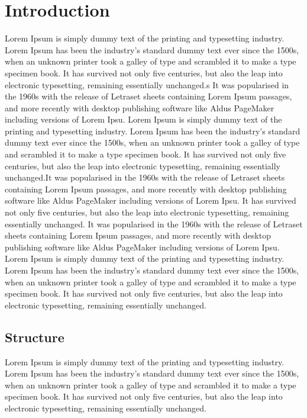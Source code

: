 \chapter{Introduction}
Lorem Ipsum is simply dummy text of the printing and typesetting industry. Lorem Ipsum has been the industry's standard dummy text ever since the 1500s, when an unknown printer took a galley of type and scrambled it to make a type specimen book. It has survived not only five centuries, but also the leap into electronic typesetting, remaining essentially unchanged.s
It was popularised in the 1960s with the release of Letraset sheets containing Lorem Ipsum passages, and more recently with desktop publishing software like Aldus PageMaker including versions of Lorem Ipsu. Lorem Ipsum is simply dummy text of the printing and typesetting industry. Lorem Ipsum has been the industry's standard dummy text ever since the 1500s, when an unknown printer took a galley of type and scrambled it to make a type specimen book.
It has survived not only five centuries, but also the leap into electronic typesetting, remaining essentially unchanged.It was popularised in the 1960s with the release of Letraset sheets containing Lorem Ipsum passages, and more recently with desktop publishing software like Aldus PageMaker including versions of Lorem Ipsu. It has survived not only five centuries, but also the leap into electronic typesetting, remaining essentially unchanged. It was popularised in the 1960s with the release of Letraset sheets containing Lorem Ipsum passages, and more recently with desktop publishing software like Aldus PageMaker including versions of Lorem Ipsu.
Lorem Ipsum is simply dummy text of the printing and typesetting industry. Lorem Ipsum has been the industry's standard dummy text ever since the 1500s, when an unknown printer took a galley of type and scrambled it to make a type specimen book. It has survived not only five centuries, but also the leap into electronic typesetting, remaining essentially unchanged.

\section{Structure}
Lorem Ipsum is simply dummy text of the printing and typesetting industry. Lorem Ipsum has been the industry's standard dummy text ever since the 1500s, when an unknown printer took a galley of type and scrambled it to make a type specimen book. It has survived not only five centuries, but also the leap into electronic typesetting, remaining essentially unchanged.

